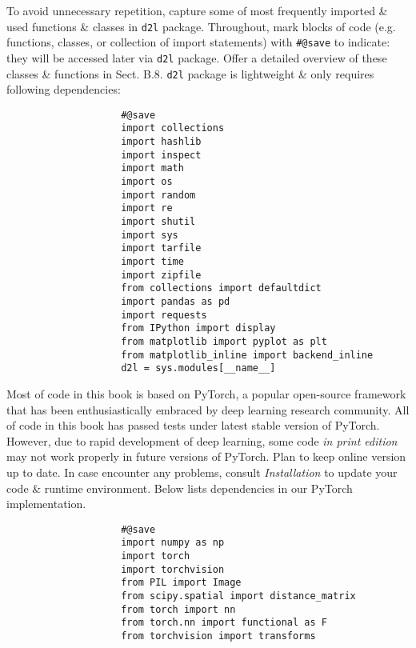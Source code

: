 \documentclass{article}
\begin{document}
\begin{enumerate}
\begin{itemize}
\begin{itemize}
\begin{itemize}
				To avoid unnecessary repetition, capture some of most frequently imported \& used functions \& classes in {\tt d2l} package. Throughout, mark blocks of code (e.g. functions, classes, or collection of import statements) with \verb|#@save| to indicate: they will be accessed later via {\tt d2l} package. Offer a detailed overview of these classes \& functions in Sect. B.8. {\tt d2l} package is lightweight \& only requires following dependencies:
				\begin{verbatim}
					#@save
					import collections
					import hashlib
					import inspect
					import math
					import os
					import random
					import re
					import shutil
					import sys
					import tarfile
					import time
					import zipfile
					from collections import defaultdict
					import pandas as pd
					import requests
					from IPython import display
					from matplotlib import pyplot as plt
					from matplotlib_inline import backend_inline
					d2l = sys.modules[__name__]
				\end{verbatim}
				Most of code in this book is based on PyTorch, a popular open-source framework that has been enthusiastically embraced by deep learning research community. All of code in this book has passed tests under latest stable version of PyTorch. However, due to rapid development of deep learning, some code {\it in print edition} may not work properly in future versions of PyTorch. Plan to keep online version up to date. In case encounter any problems, consult {\it Installation} to update your code \& runtime environment. Below lists dependencies in our PyTorch implementation.
				\begin{verbatim}
					#@save
					import numpy as np
					import torch
					import torchvision
					from PIL import Image
					from scipy.spatial import distance_matrix
					from torch import nn
					from torch.nn import functional as F
					from torchvision import transforms
				\end{verbatim}

\end{itemize}
\end{itemize}
\end{itemize}
\end{enumerate}
\end{document}
